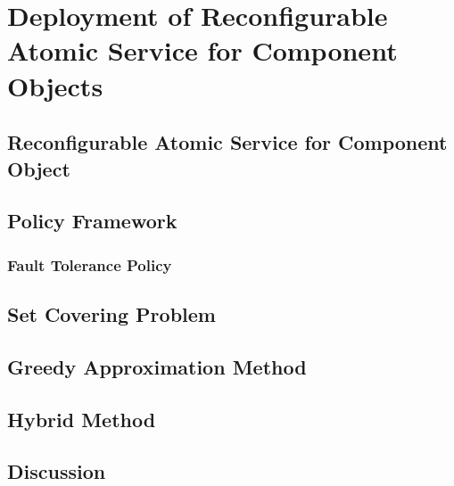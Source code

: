 \cleardoublepage
\singlespacing
\chapter{Deployment of Reconfigurable Atomic Service for Component Objects}
\label{c:deploy}
\doublespacing\nointerlineskip

\begin{comment}
Niels:about the tradeoffs in determining the deployment from your fault
tolerance perspective
\end{comment}

\section{Reconfigurable Atomic Service for Component Object}

\begin{comment}
Niels suggested that I show that I am aware of such issue with determining
optimality for deployment which is not clear for WuKong yet, there are many
ways or metrics to optimize for, all I can do in this work is to identify some
tradeoffs certain deployment for fault tolerance could influence the system
with certain metrics.

Limits will be hard to define here
\end{comment}

\section{Policy Framework}

\subsection{Fault Tolerance Policy}

\section{Set Covering Problem}


\section{Greedy Approximation Method}

\section{Hybrid Method}

\section{Discussion}

